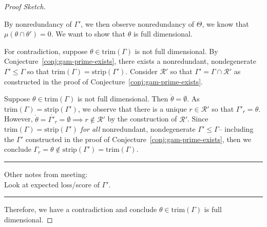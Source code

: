 \documentclass[12pt]{article}
\newcommand{\R}{\mathcal{R}}
\newcommand{\inter}[1]{\mathring{#1}}%
\newcommand{\trim}{\mathrm{trim}}
\newcommand{\strip}{\mathrm{strip}}
\begin{document}
\begin{proof}[Proof Sketch]
\begin{enumerate}
		By nonredundancy of $\Gamma'$, we then observe nonredundancy of $\Theta$, we know that $\mu(\theta \cap \theta') = 0$.
		We want to show that $\theta$ is full dimensional.
		
		For contradiction, suppose $\theta \in \trim(\Gamma)$ is not full dimensional.
		By Conjecture~\ref{conj:gam-prime-exists}, there exists a nonredundant, nondegenerate $\Gamma' \leq \Gamma$ so that $\trim(\Gamma) = \strip(\Gamma')$.
		Consider $\R'$ so that $\Gamma' = \Gamma \cap \R'$ as constructed in the proof of Conjecture~\ref{conj:gam-prime-exists}.
		
		Suppose $\theta \in \trim(\Gamma)$ is not full dimensional.
		Then $\inter{\theta} = \emptyset$.
		As $\trim(\Gamma) = \strip(\Gamma')$, we observe that there is a unique $r \in \R'$ so that $\Gamma'_r = \theta$.
		However, $\inter{\theta} = \inter{\Gamma'_r} = \emptyset \implies r \not \in \R'$ by the construction of $\R'$.
		Since $\trim(\Gamma) = \strip(\Gamma')$ \emph{for all} nonredundant, nondegenerate $\Gamma' \leq \Gamma$-- including the $\Gamma'$ constructed in the proof of Conjecture~\ref{conj:gam-prime-exists}, then we conclude $\Gamma_r = \theta \not \in \strip(\Gamma') = \trim(\Gamma)$.
		
		
		\bigskip
		\hrule
		Other notes from meeting:\\
		Look at expected loss/score of $\Gamma'$.
		\hrule
	\end{enumerate}
	
	Therefore, we have a contradiction and conclude $\theta \in \trim(\Gamma)$ is full dimensional. 
\end{proof}
\end{document}

